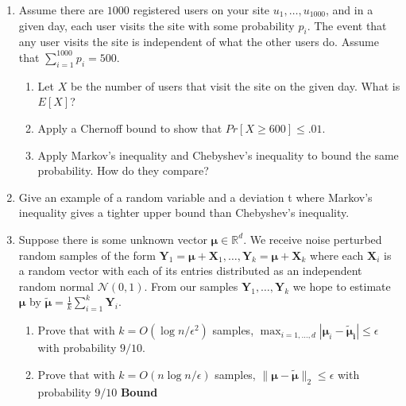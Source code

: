 \documentclass[10pt]{article}
\newcommand{\bs}[1]{\boldsymbol{#1}}
\newcommand{\bv}[1]{\mathbf{#1}}
\newcommand{\R}{\mathbb{R}}
\begin{document}
\begin{enumerate}
		\item Assume there are $1000$ registered users on your site $u_1, \ldots, u_{1000}$, and in a given day, each user
		visits the site with some probability $p_i$. The event that any user visits the site is independent of what the other users do. Assume that $\sum_{i=1}^{1000} p_i = 500$. 
		\begin{enumerate}
			\item  Let $X$ be the number of users that visit the site on the given day. What is $E[X]$?
			\item Apply a Chernoff bound to show that $Pr[X \geq 600] \leq .01$.
			\item Apply Markov’s inequality and Chebyshev’s inequality to bound the same probability.
			How do they compare?
		\end{enumerate}
		\item Give an example of a random variable and a deviation t where Markov’s inequality gives a	tighter upper bound than Chebyshev’s inequality.

		\item Suppose there is some unknown vector $\bs{\mu} \in \R^d$. We receive noise perturbed random samples of the form $\bv{Y}_1 = \bs{\mu} + \bv{X}_1, \ldots, \bv{Y}_k = \bs{\mu} + \bv{X}_k$ where each $\bv{X}_i$ is a random vector with each of its entries distributed as an independent random normal $\mathcal{N}(0,1)$. From our samples $\bv{Y}_1, \ldots, \bv{Y}_k$ we hope to estimate $\bs{\mu}$ by $\bs{\tilde{\mu}} = \frac{1}{k}\sum_{i=1}^k \bv{Y}_i$. 
		\begin{enumerate}
			\item Prove that with $k = O(\log n /\epsilon^2)$ samples, $\max_{i=1,\ldots, d}|\bs{\mu}_i -\bs{\tilde{\mu}_i} | \leq \epsilon$ with probability $9/10$.
			\item Prove that with $k = O(n\log n /\epsilon)$ samples, $\|\bs{\mu} -\bs{\tilde{\mu}}\|_2 \leq \epsilon$ with probability $9/10$ \textbf{Bound}
		\end{enumerate}


\end{enumerate}
\end{document}
